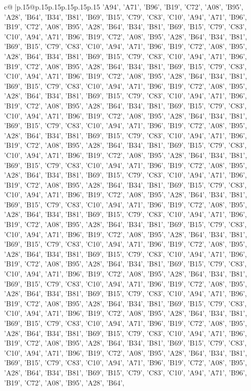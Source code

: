 \documentclass{article}
\begin{document}
{\begin{supertabular}{c@{$\;$}|p{.15\linewidth}@{}p{.15\linewidth}p{.15\linewidth}p{.15\linewidth}p{.15\linewidth}p{.15\linewidth}}
{{{{{'A94', 'A71', 'B96', 'B19', 'C72', 'A08', 'B95', 'A28', 'B64', 'B34', 'B81', 'B69', 'B15', 'C79', 'C83', 'C10', 'A94', 'A71', 'B96', 'B19', 'C72', 'A08', 'B95', 'A28', 'B64', 'B34', 'B81', 'B69', 'B15', 'C79', 'C83', 'C10', 'A94', 'A71', 'B96', 'B19', 'C72', 'A08', 'B95', 'A28', 'B64', 'B34', 'B81', 'B69', 'B15', 'C79', 'C83', 'C10', 'A94', 'A71', 'B96', 'B19', 'C72', 'A08', 'B95', 'A28', 'B64', 'B34', 'B81', 'B69', 'B15', 'C79', 'C83', 'C10', 'A94', 'A71', 'B96', 'B19', 'C72', 'A08', 'B95', 'A28', 'B64', 'B34', 'B81', 'B69', 'B15', 'C79', 'C83', 'C10', 'A94', 'A71', 'B96', 'B19', 'C72', 'A08', 'B95', 'A28', 'B64', 'B34', 'B81', 'B69', 'B15', 'C79', 'C83', 'C10', 'A94', 'A71', 'B96', 'B19', 'C72', 'A08', 'B95', 'A28', 'B64', 'B34', 'B81', 'B69', 'B15', 'C79', 'C83', 'C10', 'A94', 'A71', 'B96', 'B19', 'C72', 'A08', 'B95', 'A28', 'B64', 'B34', 'B81', 'B69', 'B15', 'C79', 'C83', 'C10', 'A94', 'A71', 'B96', 'B19', 'C72', 'A08', 'B95', 'A28', 'B64', 'B34', 'B81', 'B69', 'B15', 'C79', 'C83', 'C10', 'A94', 'A71', 'B96', 'B19', 'C72', 'A08', 'B95', 'A28', 'B64', 'B34', 'B81', 'B69', 'B15', 'C79', 'C83', 'C10', 'A94', 'A71', 'B96', 'B19', 'C72', 'A08', 'B95', 'A28', 'B64', 'B34', 'B81', 'B69', 'B15', 'C79', 'C83', 'C10', 'A94', 'A71', 'B96', 'B19', 'C72', 'A08', 'B95', 'A28', 'B64', 'B34', 'B81', 'B69', 'B15', 'C79', 'C83', 'C10', 'A94', 'A71', 'B96', 'B19', 'C72', 'A08', 'B95', 'A28', 'B64', 'B34', 'B81', 'B69', 'B15', 'C79', 'C83', 'C10', 'A94', 'A71', 'B96', 'B19', 'C72', 'A08', 'B95', 'A28', 'B64', 'B34', 'B81', 'B69', 'B15', 'C79', 'C83', 'C10', 'A94', 'A71', 'B96', 'B19', 'C72', 'A08', 'B95', 'A28', 'B64', 'B34', 'B81', 'B69', 'B15', 'C79', 'C83', 'C10', 'A94', 'A71', 'B96', 'B19', 'C72', 'A08', 'B95', 'A28', 'B64', 'B34', 'B81', 'B69', 'B15', 'C79', 'C83', 'C10', 'A94', 'A71', 'B96', 'B19', 'C72', 'A08', 'B95', 'A28', 'B64', 'B34', 'B81', 'B69', 'B15', 'C79', 'C83', 'C10', 'A94', 'A71', 'B96', 'B19', 'C72', 'A08', 'B95', 'A28', 'B64', 'B34', 'B81', 'B69', 'B15', 'C79', 'C83', 'C10', 'A94', 'A71', 'B96', 'B19', 'C72', 'A08', 'B95', 'A28', 'B64', 'B34', 'B81', 'B69', 'B15', 'C79', 'C83', 'C10', 'A94', 'A71', 'B96', 'B19', 'C72', 'A08', 'B95', 'A28', 'B64', 'B34', 'B81', 'B69', 'B15', 'C79', 'C83', 'C10', 'A94', 'A71', 'B96', 'B19', 'C72', 'A08', 'B95', 'A28', 'B64', 'B34', 'B81', 'B69', 'B15', 'C79', 'C83', 'C10', 'A94', 'A71', 'B96', 'B19', 'C72', 'A08', 'B95', 'A28', 'B64', 'B34', 'B81', 'B69', 'B15', 'C79', 'C83', 'C10', 'A94', 'A71', 'B96', 'B19', 'C72', 'A08', 'B95', 'A28', 'B64', 'B34', 'B81', 'B69', 'B15', 'C79', 'C83', 'C10', 'A94', 'A71', 'B96', 'B19', 'C72', 'A08', 'B95', 'A28', 'B64', 'B34', 'B81', 'B69', 'B15', 'C79', 'C83', 'C10', 'A94', 'A71', 'B96', 'B19', 'C72', 'A08', 'B95', 'A28', 'B64', 'B34', 'B81', 'B69', 'B15', 'C79', 'C83', 'C10', 'A94', 'A71', 'B96', 'B19', 'C72', 'A08', 'B95', 'A28', 'B64', 'B34', 'B81', 'B69', 'B15', 'C79', 'C83', 'C10', 'A94', 'A71', 'B96', 'B19', 'C72', 'A08', 'B95', 'A28', 'B64', 'B34', 'B81', 'B69', 'B15', 'C79', 'C83', 'C10', 'A94', 'A71', 'B96', 'B19', 'C72', 'A08', 'B95', 'A28', 'B64', 'B34', 'B81', 'B69', 'B15', 'C79', 'C83', 'C10', 'A94', 'A71', 'B96', 'B19', 'C72', 'A08', 'B95', 'A28', 'B64', }}}}}
\end{supertabular}}
\end{document}
